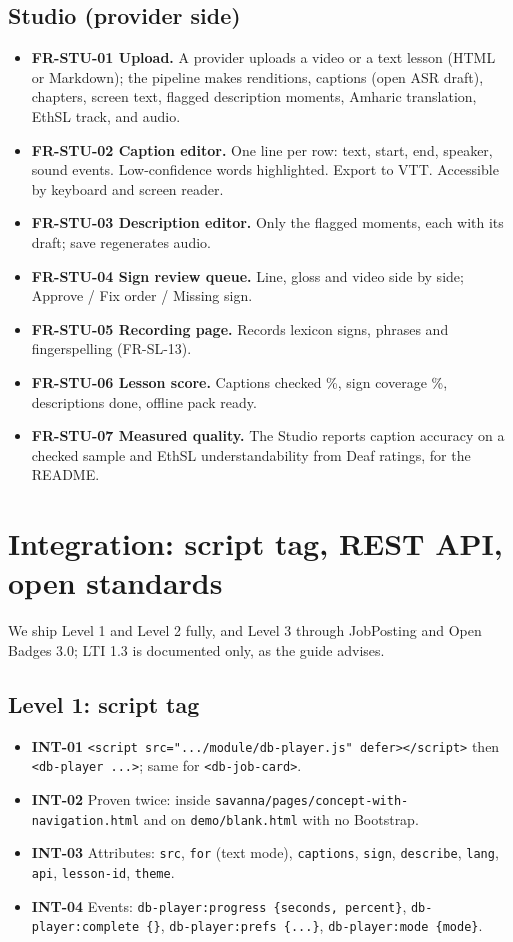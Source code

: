 \documentclass[11pt,a4paper]{article}
\newcommand{\code}[1]{\texttt{#1}}
\newcommand{\req}[1]{\textbf{#1}}
\begin{document}
\subsection{Studio (provider side)}
\begin{itemize}
  \item \req{FR-STU-01 Upload.} A provider uploads a video or a text lesson (HTML or Markdown); the pipeline makes renditions, captions (open ASR draft), chapters, screen text, flagged description moments, Amharic translation, EthSL track, and audio.
  \item \req{FR-STU-02 Caption editor.} One line per row: text, start, end, speaker, sound events. Low-confidence words highlighted. Export to VTT. Accessible by keyboard and screen reader.
  \item \req{FR-STU-03 Description editor.} Only the flagged moments, each with its draft; save regenerates audio.
  \item \req{FR-STU-04 Sign review queue.} Line, gloss and video side by side; Approve / Fix order / Missing sign.
  \item \req{FR-STU-05 Recording page.} Records lexicon signs, phrases and fingerspelling (FR-SL-13).
  \item \req{FR-STU-06 Lesson score.} Captions checked \%, sign coverage \%, descriptions done, offline pack ready.
  \item \req{FR-STU-07 Measured quality.} The Studio reports caption accuracy on a checked sample and EthSL understandability from Deaf ratings, for the README.
\end{itemize}

\section{Integration: script tag, REST API, open standards}

We ship Level 1 and Level 2 fully, and Level 3 through JobPosting and Open Badges 3.0; LTI 1.3 is documented only, as the guide advises.

\subsection{Level 1: script tag}
\begin{itemize}
  \item \req{INT-01} \code{<script src=".../module/db-player.js" defer></script>} then \code{<db-player ...>}; same for \code{<db-job-card>}.
  \item \req{INT-02} Proven twice: inside \code{savanna/\allowbreak pages/\allowbreak concept-with-navigation.html} and on \code{demo/blank.html} with no Bootstrap.
  \item \req{INT-03} Attributes: \code{src}, \code{for} (text mode), \code{captions}, \code{sign}, \code{describe}, \code{lang}, \code{api}, \code{lesson-id}, \code{theme}.
  \item \req{INT-04} Events: \code{db-player:progress \{seconds, percent\}}, \code{db-player:complete \{\}}, \code{db-player:prefs \{...\}}, \code{db-player:mode \{mode\}}.
\end{itemize}
\end{document}
